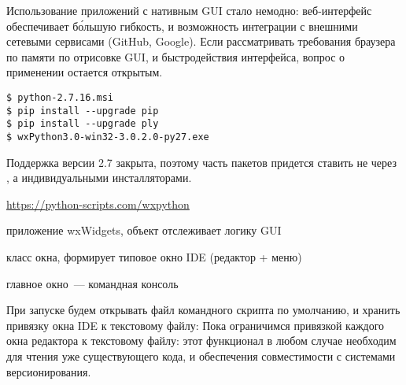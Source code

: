 \label{wx}\secdown

\noindent
Использование приложений с нативным GUI стало немодно: веб-интер\-фейс
обеспечивает б\'{о}льшую гибкость, и возможность
интеграции с внешними сетевыми сервисами (GitHub, Google). Если рассматривать
требования браузера по памяти по отрисовке GUI, и быстродействия интерфейса,
вопрос о применении  остается открытым.


\begin{verbatim}
$ python-2.7.16.msi
$ pip install --upgrade pip
$ pip install --upgrade ply
$ wxPython3.0-win32-3.0.2.0-py27.exe
\end{verbatim}

\noindent
Поддержка версии 2.7 закрыта, поэтому часть пакетов придется ставить не через
, а индивидуальными инсталляторами.

\secdown

\url{https://python-scripts.com/wxpython}

\clearpage
{}

\begin{description}[nosep]
\item[ide] приложение wxWidgets, объект отслеживает логику GUI
\item[ideWindow] класс окна, формирует типовое окно IDE (редактор + меню)
\item[ideConsole] главное окно\ --- командная консоль
\end{description}



\clearpage
{}

\clearpage
При запуске будем открывать файл командного скрипта по умолчанию, и хранить
привязку окна IDE к текстовому файлу:
Пока ограничимся привязкой каждого окна редактора к текстовому файлу: этот
функционал в любом случае необходим для чтения уже существующего кода, и
обеспечения совместимости с системами версионирования.
\clearpage
{}

